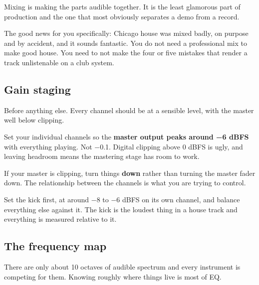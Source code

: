 Mixing is making the parts audible together. It is the least glamorous part of production
and the one that most obviously separates a demo from a record.

The good news for you specifically: Chicago house was mixed badly, on purpose and by
accident, and it sounds fantastic. You do not need a professional mix to make good house.
You need to not make the four or five mistakes that render a track unlistenable on a club
system.

\subsection{Gain staging}\label{th07_mixing-gain-staging}

Before anything else. Every channel should be at a sensible level, with the master well
below clipping.

Set your individual channels so the \textbf{master output peaks around −6 dBFS} with everything
playing. Not −0.1. Digital clipping above 0 dBFS is ugly, and leaving headroom means the
mastering stage has room to work.

If your master is clipping, turn things \textbf{down} rather than turning the master fader down.
The relationship between the channels is what you are trying to control.

Set the kick first, at around −8 to −6 dBFS on its own channel, and balance everything else
against it. The kick is the loudest thing in a house track and everything is measured
relative to it.

\subsection{The frequency map}\label{th07_mixing-the-frequency-map}

There are only about 10 octaves of audible spectrum and every instrument is competing for
them. Knowing roughly where things live is most of EQ.

